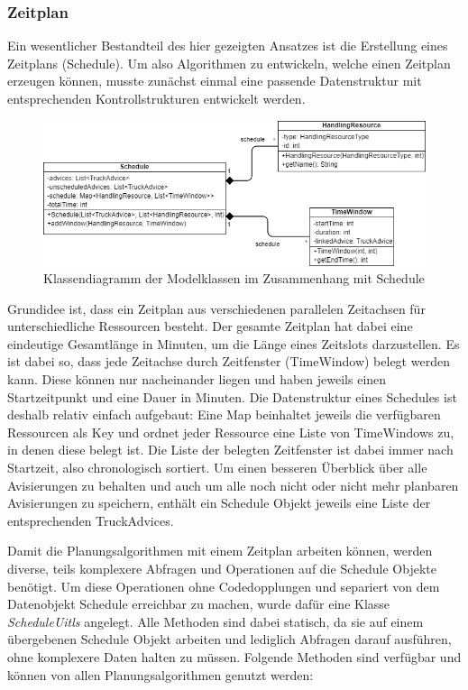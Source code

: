 \subsubsection{Zeitplan}

Ein wesentlicher Bestandteil des hier gezeigten Ansatzes ist die Erstellung eines Zeitplans (Schedule). Um also Algorithmen zu entwickeln, welche einen Zeitplan erzeugen können, musste zunächst einmal eine passende Datenstruktur mit entsprechenden Kontrollstrukturen entwickelt werden. 

\begin{figure}[H]
    \centering
    \includegraphics[width=\textwidth]{images/classDiagrams/Schedule_ClassDiagram.png}
    \caption{Klassendiagramm der Modelklassen im Zusammenhang mit Schedule}
    \label{fig:classDiagramSchedule}
\end{figure}

Grundidee ist, dass ein Zeitplan aus verschiedenen parallelen Zeitachsen für unterschiedliche Ressourcen besteht. Der gesamte Zeitplan hat dabei eine eindeutige Gesamtlänge in Minuten, um die Länge eines Zeitslots darzustellen. Es ist dabei so, dass jede Zeitachse durch Zeitfenster (TimeWindow) belegt werden kann. Diese können nur nacheinander liegen und haben jeweils einen Startzeitpunkt und eine Dauer in Minuten. Die Datenstruktur eines Schedules ist deshalb relativ einfach aufgebaut: Eine Map beinhaltet jeweils die verfügbaren Ressourcen als Key und ordnet jeder Ressource eine Liste von TimeWindows zu, in denen diese belegt ist. Die Liste der belegten Zeitfenster ist dabei immer nach Startzeit, also chronologisch sortiert. Um einen besseren Überblick über alle Avisierungen zu behalten und auch um alle noch nicht oder nicht mehr planbaren Avisierungen zu speichern, enthält ein Schedule Objekt jeweils eine Liste der entsprechenden TruckAdvices. 

Damit die Planungsalgorithmen mit einem Zeitplan arbeiten können, werden diverse, teils komplexere Abfragen und Operationen auf die Schedule Objekte benötigt. Um diese Operationen ohne Codedopplungen und separiert von dem Datenobjekt Schedule erreichbar zu machen, wurde dafür eine Klasse \textit{ScheduleUitls} angelegt. Alle Methoden sind dabei statisch, da sie auf einem übergebenen Schedule Objekt arbeiten und lediglich Abfragen darauf ausführen, ohne komplexere Daten halten zu müssen. Folgende Methoden sind verfügbar und können von allen Planungsalgorithmen genutzt werden:

